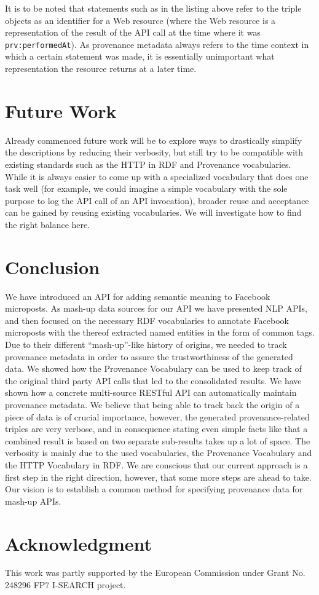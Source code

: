 \documentclass[conference]{IEEEtran}
\begin{document}
It is to be noted that statements such as in the listing above refer to the triple objects as an identifier for a Web resource (where the Web resource is a representation of the result of the API call at the time where it was \texttt{prv:performedAt}). As provenance metadata always refers to the time context in which a certain statement was made, it is essentially unimportant what representation the resource returns at a later time.

\section{Future Work} \label{sec:future}
Already commenced future work will be to explore ways to drastically simplify the descriptions by reducing their verbosity, but still try to be compatible with existing standards such as the HTTP in RDF and Provenance vocabularies. While it is always easier to come up with a specialized vocabulary that does one task well (for example, we could imagine a simple vocabulary with the sole purpose to log the API call of an API invocation), broader reuse and acceptance can be gained by reusing existing vocabularies. We will investigate how to find the right balance here.

\section{Conclusion}                                                        \label{sec:conclusion}
We have introduced an API for adding semantic meaning to Facebook microposts. As mash-up data sources for our API we have presented NLP APIs, and then focused on the necessary RDF vocabularies to annotate Facebook microposts with the thereof extracted named entities in the form of common tags. Due to their different ``mash-up''-like history of origins, we needed to track provenance metadata in order to assure the trustworthiness of the generated data. We showed how the Provenance Vocabulary can be used to keep track of the original third party API calls that led to the consolidated results. We have shown how a concrete multi-source RESTful API can automatically maintain provenance metadata. We believe that being able to track back the origin of a piece of data is of crucial importance, however, the generated provenance-related triples are very verbose, and in consequence stating even simple facts like that a combined result is based on two separate sub-results takes up a lot of space. The verbosity is mainly due to the used vocabularies, the Provenance Vocabulary and the HTTP Vocabulary in RDF. We are conscious that our current approach is a first step in the right direction, however, that some more steps are ahead to take. Our vision is to establish a common method for specifying provenance data for mash-up APIs.

\section*{Acknowledgment}

This work was partly supported by the European Commission under Grant No. 248296 FP7 I-SEARCH project.



\end{document}
